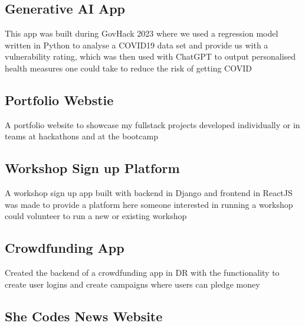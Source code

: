 \documentclass[11pt, a4paper]{MagicalCV}
\begin{document}
\newpage
\begin{minipage}[t]{1\textwidth}
\sectionsep

\sectionsep

\subsection{Generative AI App} 
This app was built during GovHack 2023 where we used a regression model written in Python to analyse a COVID19 data set and provide us with a vulnerability rating, which was then used with ChatGPT to output personalised health measures one could take to reduce the risk of getting COVID
\sectionsep

\subsection{Portfolio Webstie} 

A portfolio website to showcase my fullstack projects developed individually or in teams at hackathons and at the bootcamp
\sectionsep

\subsection{Workshop Sign up Platform} 

 A workshop sign up app built with backend in Django and frontend in ReactJS was made to provide a platform here someone interested in running a workshop could volunteer to run a new or existing workshop
\sectionsep

\subsection{Crowdfunding App}
 
Created the backend of a crowdfunding app in DR with the functionality to create user logins and create campaigns where users can pledge money
\sectionsep

\subsection{She Codes News Website}
 

\end{minipage}
\end{document}
